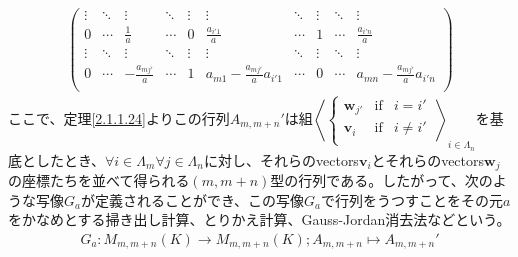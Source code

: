 \documentclass[dvipdfmx]{jsarticle}
\begin{document}
\begin{dfn}
\begin{align*}
\begin{pmatrix}
 \vdots & \ddots & \vdots & \ddots & \vdots & \vdots & \ddots & \vdots & \ddots & \vdots \\
0 & \cdots & \frac{1}{a} & \cdots & 0 & \frac{a_{i'1}}{a} & \cdots & 1 & \cdots & \frac{a_{i'n}}{a} \\
 \vdots & \ddots & \vdots & \ddots & \vdots & \vdots & \ddots & \vdots & \ddots & \vdots \\
0 & \cdots & - \frac{a_{mj'}}{a} & \cdots & 1 & a_{m1} - \frac{a_{mj'}}{a}a_{i'1} & \cdots & 0 & \cdots & a_{mn} - \frac{a_{mj'}}{a}a_{i'n} \\
\end{pmatrix}\end{align*}
ここで、定理\ref{2.1.1.24}よりこの行列$A_{m,m + n}'$は組$\left\langle \left\{ \begin{matrix}
\mathbf{w}_{j'} & \mathrm{if} & i = i' \\
\mathbf{v}_{i} & \mathrm{if} & i \neq i' \\
\end{matrix} \right.\  \right\rangle_{i \in \varLambda_{n}}$を基底としたとき、$\forall i \in \varLambda_{m}\forall j \in \varLambda_{n}$に対し、それらのvectors$\mathbf{v}_{i}$とそれらのvectors$\mathbf{w}_{j}$の座標たちを並べて得られる$(m,m + n)$型の行列である。したがって、次のような写像$G_{a}$が定義されることができ、この写像$G_{a}$で行列をうつすことをその元$a$をかなめとする掃き出し計算、とりかえ計算、Gauss-Jordan消去法などという。
\begin{align*}
G_{a}:M_{m,m + n}(K) \rightarrow M_{m,m + n}(K);A_{m,m + n} \mapsto A_{m,m + n}'
\end{align*}
\end{dfn}
\end{document}
